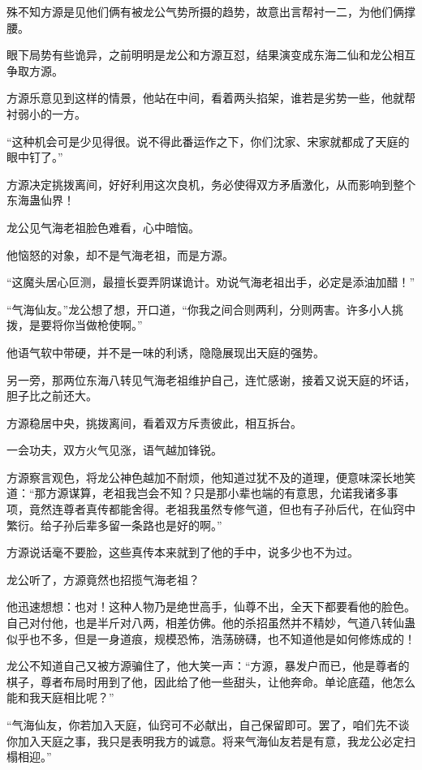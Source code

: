 \begin{this_body}
殊不知方源是见他们俩有被龙公气势所摄的趋势，故意出言帮衬一二，为他们俩撑腰。

眼下局势有些诡异，之前明明是龙公和方源互怼，结果演变成东海二仙和龙公相互争取方源。

方源乐意见到这样的情景，他站在中间，看着两头掐架，谁若是劣势一些，他就帮衬弱小的一方。

“这种机会可是少见得很。说不得此番运作之下，你们沈家、宋家就都成了天庭的眼中钉了。”

方源决定挑拨离间，好好利用这次良机，务必使得双方矛盾激化，从而影响到整个东海蛊仙界！

龙公见气海老祖脸色难看，心中暗恼。

他恼怒的对象，却不是气海老祖，而是方源。

“这魔头居心叵测，最擅长耍弄阴谋诡计。劝说气海老祖出手，必定是添油加醋！”

“气海仙友。”龙公想了想，开口道，“你我之间合则两利，分则两害。许多小人挑拨，是要将你当做枪使啊。”

他语气软中带硬，并不是一味的利诱，隐隐展现出天庭的强势。

另一旁，那两位东海八转见气海老祖维护自己，连忙感谢，接着又说天庭的坏话，胆子比之前还大。

方源稳居中央，挑拨离间，看着双方斥责彼此，相互拆台。

一会功夫，双方火气见涨，语气越加锋锐。

方源察言观色，将龙公神色越加不耐烦，他知道过犹不及的道理，便意味深长地笑道：“那方源谋算，老祖我岂会不知？只是那小辈也端的有意思，允诺我诸多事项，竟然连尊者真传都能舍得。老祖我虽然专修气道，但也有子孙后代，在仙窍中繁衍。给子孙后辈多留一条路也是好的啊。”

方源说话毫不要脸，这些真传本来就到了他的手中，说多少也不为过。

龙公听了，方源竟然也招揽气海老祖？

他迅速想想：也对！这种人物乃是绝世高手，仙尊不出，全天下都要看他的脸色。自己对付他，也是半斤对八两，相差仿佛。他的杀招虽然并不精妙，气道八转仙蛊似乎也不多，但是一身道痕，规模恐怖，浩荡磅礴，也不知道他是如何修炼成的！

龙公不知道自己又被方源骗住了，他大笑一声：“方源，暴发户而已，他是尊者的棋子，尊者布局时用到了他，因此给了他一些甜头，让他奔命。单论底蕴，他怎么能和我天庭相比呢？”

“气海仙友，你若加入天庭，仙窍可不必献出，自己保留即可。罢了，咱们先不谈你加入天庭之事，我只是表明我方的诚意。将来气海仙友若是有意，我龙公必定扫榻相迎。”


\end{this_body}
